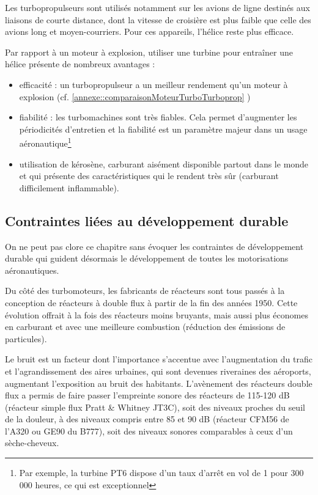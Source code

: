 		Les turbopropulseurs sont utilisés notamment sur les avions de ligne destinés aux liaisons de courte distance, dont la vitesse de croisière est plus faible que celle des avions long et moyen-courriers. Pour ces appareils, l'hélice reste plus efficace.
		
		Par rapport à un moteur à explosion, utiliser une turbine pour entraîner une hélice présente de nombreux avantages :
		\begin{itemize}
			\item efficacité : un turbopropulseur a un meilleur rendement qu'un moteur à explosion (cf. \ref{annexe::comparaisonMoteurTurboTurboprop} )
			\item fiabilité : les turbomachines sont très fiables. Cela permet d'augmenter les périodicités d'entretien et la fiabilité est un paramètre majeur dans un usage aéronautique\footnote{Par exemple, la turbine PT6 dispose d'un taux d'arrêt en vol de 1 pour 300\,000 heures, ce qui est exceptionnel}
			\item utilisation de kérosène, carburant aisément disponible partout dans le monde et qui présente des caractéristiques qui le rendent très sûr (carburant difficilement inflammable).
		\end{itemize}
		
	\subsection{Contraintes liées au développement durable}
	On ne peut pas clore ce chapitre sans évoquer les contraintes de développement durable qui guident désormais le développement de toutes les motorisations aéronautiques.
	
	Du côté des turbomoteurs, les fabricants de réacteurs sont tous passés à la conception de réacteurs à double flux à partir de la fin des années 1950. Cette évolution offrait à la fois des réacteurs moins bruyants, mais aussi plus économes en carburant et avec une meilleure combustion (réduction des émissions de particules). 
	
	Le bruit est un facteur dont l'importance s'accentue avec l'augmentation du trafic et l'agrandissement des aires urbaines, qui sont devenues riveraines des aéroports, augmentant l'exposition au bruit des habitants. L'avènement des réacteurs double flux a permis de faire passer l'empreinte sonore des réacteurs de 115-120 dB (réacteur simple flux Pratt \& Whitney JT3C), soit des niveaux proches du seuil de la douleur, à des niveaux compris entre 85 et 90 dB (réacteur CFM56 de l'A320 ou GE90 du B777), soit des niveaux sonores comparables à ceux d'un sèche-cheveux.
	
